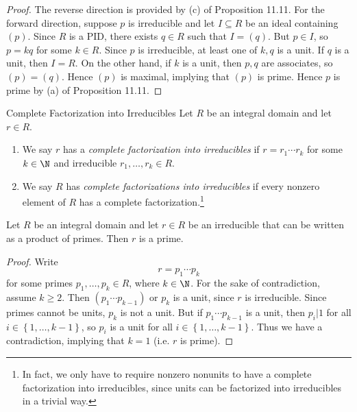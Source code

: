 \documentclass[pmath347]{subfiles}
\begin{document}
    \begin{proof}
        The reverse direction is provided by (c) of Proposition 11.11. For the forward direction, suppose $p$ is irreducible and let $I\subseteq R$ be an ideal containing $\left( p \right)$. Since $R$ is a PID, there exists $q\in R$ such that $I=\left( q \right)$. But $p\in I$, so $p=kq$ for some $k\in R$. Since $p$ is irreducible, at least one of $k,q$ is a unit. If $q$ is a unit, then $I=R$. On the other hand, if $k$ is a unit, then $p,q$ are associates, so $\left( p \right) = \left( q \right)$. Hence $\left( p \right)$ is maximal, implying that $\left( p \right)$ is prime. Hence $p$ is prime by (a) of Proposition 11.11.
    \end{proof}

    \begin{definition}{Complete Factorization into Irreducibles}{}
        Let $R$ be an integral domain and let $r\in R$.
        \begin{enumerate}
            \item We say $r$ has a \emph{complete factorization into irreducibles} if $r=r_1\cdots r_k$ for some $k\in\N$ and irreducible $r_1,\ldots,r_k\in R$.
            \item We say $R$ has \emph{complete factorizations into irreducibles} if every nonzero element of $R$ has a complete factorization.\footnote{In fact, we only have to require nonzero nonunits to have a complete factorization into irreducibles, since units can be factorized into irreducibles in a trivial way.}
        \end{enumerate}
    \end{definition}

    \begin{prop}{}
        Let $R$ be an integral domain and let $r\in R$ be an irreducible that can be written as a product of primes. Then $r$ is a prime.
    \end{prop}

    \begin{proof}
        Write
        \begin{equation*}
            r = p_1\cdots p_k
        \end{equation*}
        for some primes $p_1,\ldots,p_k\in R$, where $k\in\N$. For the sake of contradiction, assume $k\geq 2$. Then $\left( p_1\cdots p_{k-1} \right)$ or $p_k$ is a unit, since $r$ is irreducible. Since primes cannot be units, $p_k$ is not a unit. But if $p_1\cdots p_{k-1}$ is a unit, then $p_i|1$ for all $i\in\left\lbrace 1,\ldots,k-1 \right\rbrace$, so $p_i$ is a unit for all $i\in\left\lbrace 1,\ldots,k-1 \right\rbrace$. Thus we have a contradiction, implying that $k=1$ (i.e. $r$ is prime).
    \end{proof}
\end{document}
